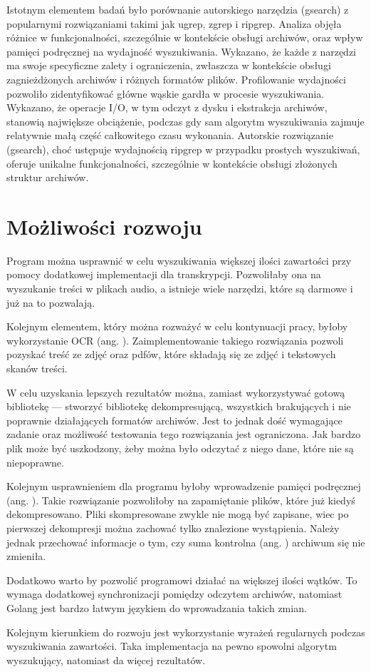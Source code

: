 Istotnym elementem badań było porównanie autorskiego narzędzia (gsearch) z 
popularnymi rozwiązaniami takimi jak ugrep, zgrep i ripgrep. Analiza objęła 
różnice w funkcjonalności, szczególnie w kontekście obsługi archiwów, oraz wpływ
pamięci podręcznej na wydajność wyszukiwania. Wykazano, że każde z narzędzi ma
swoje specyficzne zalety i ograniczenia, zwłaszcza w kontekście obsługi
zagnieżdżonych archiwów i różnych formatów plików. Profilowanie wydajności 
pozwoliło zidentyfikować główne wąskie gardła w procesie wyszukiwania. Wykazano,
że operacje I/O, w tym odczyt z dysku i ekstrakcja archiwów, stanowią największe
obciążenie, podczas gdy sam algorytm wyszukiwania zajmuje relatywnie małą część
całkowitego czasu wykonania. Autorskie rozwiązanie (gsearch), choć ustępuje
wydajnością ripgrep w przypadku prostych wyszukiwań, oferuje unikalne 
funkcjonalności, szczególnie w kontekście obsługi złożonych struktur archiwów.

\section{Możliwości rozwoju}

Program można usprawnić w celu wyszukiwania większej ilości zawartości przy
pomocy dodatkowej implementacji dla transkrypcji. Pozwoliłaby ona na wyszukanie
treści w plikach audio, a istnieje wiele narzędzi, które są darmowe i już
na to pozwalają.

Kolejnym elementem, który można rozważyć w celu kontynuacji pracy, byłoby 
wykorzystanie OCR (ang. ). Zaimplementowanie
takiego rozwiązania pozwoli pozyskać treść ze zdjęć oraz pdfów, które składają 
się ze zdjęć i tekstowych skanów treści.

W celu uzyskania lepszych rezultatów można, zamiast wykorzystywać gotową 
bibliotekę — stworzyć bibliotekę dekompresującą, wszystkich brakujących i nie
poprawnie działających formatów archiwów. Jest to jednak dość wymagające zadanie
oraz możliwość testowania tego rozwiązania jest ograniczona. Jak bardzo 
plik może być uszkodzony, żeby można było odczytać z niego dane, które nie są
niepoprawne.

Kolejnym usprawnieniem dla programu byłoby wprowadzenie pamięci podręcznej (ang. ).
Takie rozwiązanie pozwoliłoby na zapamiętanie plików, które już kiedyś dekompresowano.
Pliki skompresowane zwykle nie mogą być zapisane, wiec po pierwszej dekompresji
można zachować tylko znalezione wystąpienia. Należy jednak przechować 
informacje o tym, czy suma kontrolna (ang. ) archiwum się nie 
zmieniła.

Dodatkowo warto by pozwolić programowi działać na większej ilości wątków. To 
wymaga dodatkowej synchronizacji pomiędzy odczytem archiwów, natomiast
Golang jest bardzo łatwym językiem do wprowadzania takich zmian.

Kolejnym kierunkiem do rozwoju jest wykorzystanie wyrażeń regularnych podczas
wyszukiwania zawartości. Taka implementacja na pewno spowolni algorytm 
wyszukujący, natomiast da więcej rezultatów.